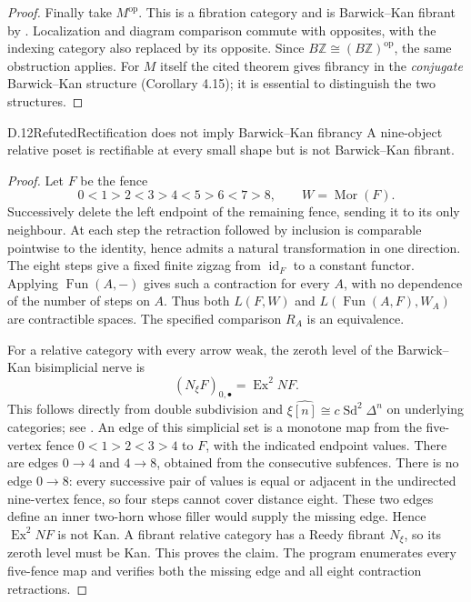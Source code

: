 \begin{proof}
Finally take $M^{\mathrm{op}}$. This is a fibration category and is
Barwick--Kan fibrant by \citet[Theorem 4.13]{DMeier2016}. Localization
and diagram comparison commute with opposites, with the indexing
category also replaced by its opposite. Since
$B\mathbb Z\cong(B\mathbb Z)^{\mathrm{op}}$, the same obstruction
applies. For $M$ itself the cited theorem gives fibrancy in the
\emph{conjugate} Barwick--Kan structure (Corollary 4.15); it is essential
to distinguish the two structures.
\end{proof}

\begin{result}{D.12}{Refuted}{Rectification does not imply Barwick--Kan fibrancy}
A nine-object relative poset is rectifiable at every small shape but
is not Barwick--Kan fibrant.
\end{result}
\begin{proof}
Let $F$ be the fence
\[
 0<1>2<3>4<5>6<7>8,
 \qquad W=\operatorname{Mor}(F).
\]
Successively delete the left endpoint of the remaining fence, sending
it to its only neighbour. At each step the retraction followed by
inclusion is comparable pointwise to the identity, hence admits a
natural transformation in one direction. The eight steps give a fixed
finite zigzag from $\operatorname{id}_F$ to a constant functor. Applying
$\operatorname{Fun}(A,-)$ gives such a contraction for every $A$, with
no dependence of the number of steps on $A$. Thus both
$L(F,W)$ and $L(\operatorname{Fun}(A,F),W_A)$ are contractible spaces.
The specified comparison $R_A$ is an equivalence.

For a relative category with every arrow weak, the zeroth level of the
Barwick--Kan bisimplicial nerve is
\[
 (N_\xi F)_{0,\bullet}=\operatorname{Ex}^{2}NF.
\]
This follows directly from double subdivision and
$\xi\widehat{[n]}\cong c\operatorname{Sd}^{2}\Delta^n$ on underlying
categories; see \citet[Example 2.5 and Definition 2.6]{DMeier2016}.
An edge of this simplicial set is a monotone map from the five-vertex
fence $0<1>2<3>4$ to $F$, with the indicated endpoint values.
There are edges $0\to4$ and $4\to8$, obtained from the consecutive
subfences. There is no edge $0\to8$: every successive pair of values
is equal or adjacent in the undirected nine-vertex fence, so four
steps cannot cover distance eight. These two edges define an inner
two-horn whose filler would supply the missing edge. Hence
$\operatorname{Ex}^{2}NF$ is not Kan. A fibrant relative category has
a Reedy fibrant $N_\xi$, so its zeroth level must be Kan. This proves
the claim. The program enumerates every five-fence map and verifies
both the missing edge and all eight contraction retractions.
\end{proof}


